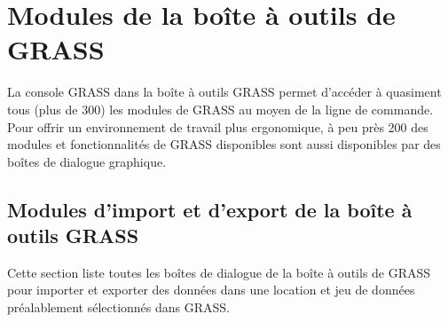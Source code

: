 \chapter{Modules de la boîte à outils de GRASS }\label{appdx_grass_toolbox_modules}

La console GRASS dans la boîte à outils GRASS permet d'accéder à quasiment tous (plus de 300) les modules de GRASS au moyen de la ligne de commande. Pour offrir un environnement de travail plus ergonomique, à peu près 200 des modules et fonctionnalités de GRASS disponibles sont aussi disponibles par des boîtes de dialogue graphique.

\section{Modules d'import et d'export de la boîte à outils GRASS}

Cette section liste toutes les boîtes de dialogue de la boîte à outils de GRASS pour importer et exporter des données dans une location et jeu de données préalablement sélectionnés dans GRASS.


